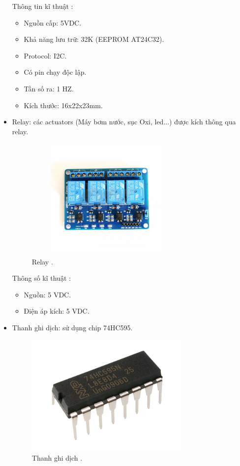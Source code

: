\documentclass[a4paper,12pt,oneside]{article}
\begin{document}
\begin{itemize}
Thông tin kĩ thuật \cite{ds1307}:
\begin{itemize}
\item Nguồn cấp: 5VDC.
\item Khả năng lưu trữ: 32K (EEPROM AT24C32).
\item Protocol: I2C.
\item Có pin chạy độc lập.
\item Tần số ra: 1 HZ.
\item Kích thước: 16x22x23mm.
\end{itemize}

\item Relay: các actuators (Máy bơm nước, sục Oxi, led...) được kích thông qua relay.
\begin{figure}[H]
	\centering
	\includegraphics[height=6cm,width=8cm]{hinh/Relay.jpg}
	\caption{Relay \cite{dientuachau}.}
	\label{fig:Relay}
\end{figure}

\noindent Thông số kĩ thuật \cite{dientuachau}:
\begin{itemize}
	\item Nguồn: 5 VDC.
	\item Điện áp kích: 5 VDC.
\end{itemize}

\item Thanh ghi dịch: sử dụng chip 74HC595.
\begin{figure}[H]
	\centering
	\includegraphics[height=6cm,width=8cm]{hinh/Register.jpg}
	\caption{Thanh ghi dịch \cite{dientuachau}.}
\end{figure}


\end{itemize}
\end{document}

